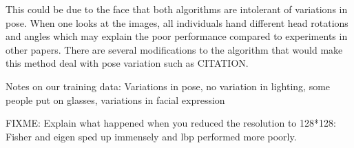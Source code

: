 \documentclass{article}
\begin{document}
This could be due to the face that both algorithms are intolerant of variations in pose. When one looks at the images, all individuals hand different head rotations and angles which may explain the poor performance compared to experiments in other papers\cite{belhumeur1997eigenfaces}. There are several modifications to the algorithm that would make this method deal with pose variation such as CITATION.

Notes on our training data: Variations in pose, no variation in lighting, some people put on glasses, variations in facial expression

FIXME: Explain what happened when you reduced the resolution to 128*128: Fisher and eigen sped up immensely and lbp performed more poorly.




\end{document}
